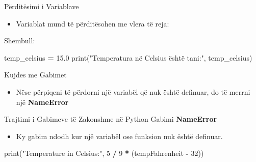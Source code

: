 \documentclass[
  ignorenonframetext,
]{beamer}
\newenvironment{Shaded}{\begin{snugshade}}{\end{snugshade}}
\newcommand{\BuiltInTok}[1]{#1}
\newcommand{\DecValTok}[1]{\textcolor[rgb]{0.00,0.00,0.81}{#1}}
\newcommand{\FloatTok}[1]{\textcolor[rgb]{0.00,0.00,0.81}{#1}}
\newcommand{\NormalTok}[1]{#1}
\newcommand{\OperatorTok}[1]{\textcolor[rgb]{0.81,0.36,0.00}{\textbf{#1}}}
\newcommand{\StringTok}[1]{\textcolor[rgb]{0.31,0.60,0.02}{#1}}
\providecommand{\tightlist}{%
  \setlength{\itemsep}{0pt}\setlength{\parskip}{0pt}}
\begin{document}
\begin{frame}[fragile]{Përditësimi i Variablave}
\protect\hypertarget{puxebrdituxebsimi-i-variablave}{}
\begin{itemize}
\tightlist
\item
  Variablat mund të përditësohen me vlera të reja:
\end{itemize}

Shembull:

\begin{Shaded}
\begin{Highlighting}[]
\NormalTok{temp\_celsius }\OperatorTok{=} \FloatTok{15.0}
\BuiltInTok{print}\NormalTok{(}\StringTok{"Temperatura në Celsius është tani:"}\NormalTok{, temp\_celsius)}
\end{Highlighting}
\end{Shaded}
\end{frame}

\begin{frame}{Kujdes me Gabimet}
\protect\hypertarget{kujdes-me-gabimet}{}
\begin{itemize}
\tightlist
\item
  Nëse përpiqeni të përdorni një variabël që nuk është definuar, do të
  merrni një \textbf{NameError}
\end{itemize}
\end{frame}

\begin{frame}[fragile]{Trajtimi i Gabimeve të Zakonshme në Python}
\protect\hypertarget{trajtimi-i-gabimeve-tuxeb-zakonshme-nuxeb-python}{}
Gabimi \textbf{NameError}

\begin{itemize}
\tightlist
\item
  Ky gabim ndodh kur një variabël ose funksion nuk është definuar.
\end{itemize}

\begin{Shaded}
\begin{Highlighting}[]
\BuiltInTok{print}\NormalTok{(}\StringTok{"Temperature in Celsius:"}\NormalTok{, }\DecValTok{5} \OperatorTok{/} \DecValTok{9} \OperatorTok{*}\NormalTok{ (tempFahrenheit }\OperatorTok{{-}} \DecValTok{32}\NormalTok{))}
\end{Highlighting}
\end{Shaded}
\end{frame}
\end{document}
